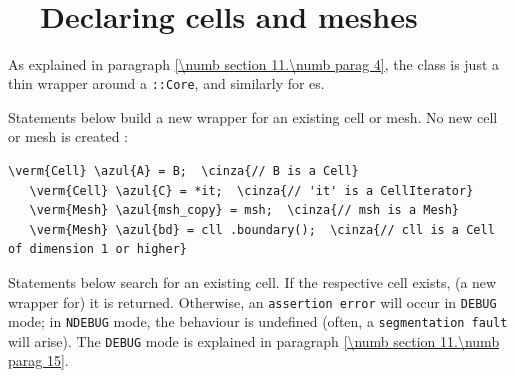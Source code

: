 \section{~~\cinza{[empty]}}\label{\numb section 9.\numb parag 9}


\section{~~Declaring cells and meshes}\label{\numb section 9.\numb parag 10}

As explained in paragraph \ref{\numb section 11.\numb parag 4}, the {\small\tt {}} class
is just a thin wrapper around a {\small\tt {}::Core}, and similarly for {\small\tt {}}es.

Statements below build a new wrapper for an existing cell or mesh.
No new cell or mesh is created :

\begin{Verbatim}[commandchars=\\\{\},formatcom=\small\tt,
   baselinestretch=0.94,framesep=2mm                      ]
   \verm{Cell} \azul{A} = B;  \cinza{// B is a Cell}
   \verm{Cell} \azul{C} = *it;  \cinza{// 'it' is a CellIterator}
   \verm{Mesh} \azul{msh_copy} = msh;  \cinza{// msh is a Mesh}
   \verm{Mesh} \azul{bd} = cll .boundary();  \cinza{// cll is a Cell of dimension 1 or higher}
\end{Verbatim}

Statements below search for an existing cell.
If the respective cell exists, (a new wrapper for) it is returned.
Otherwise, an {\small\tt assertion error} will occur in {\small\tt DEBUG} mode;
in {\small\tt NDEBUG} mode, the behaviour is undefined (often, a {\small\tt segmentation fault}
will arise).
The {\small\tt DEBUG} mode is explained in paragraph \ref{\numb section 11.\numb parag 15}.

